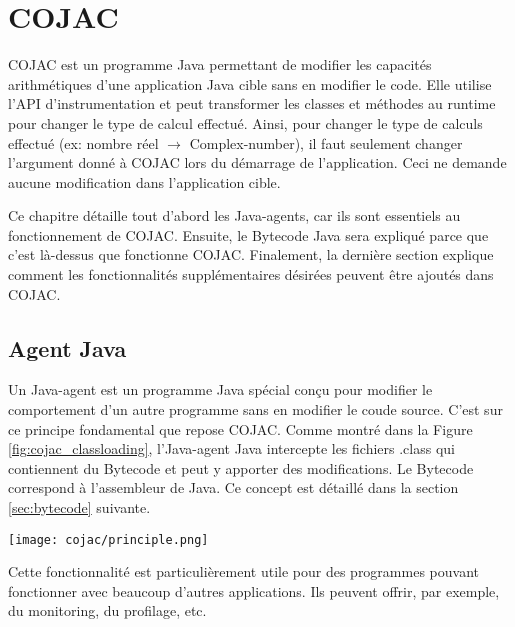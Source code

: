 
\chapter{COJAC}

\gls{COJAC} \cite{COJAC} est un programme Java permettant de modifier les capacités arithmétiques d'une application Java cible sans en modifier le code. Elle utilise l'API d'instrumentation et peut transformer les classes et méthodes au runtime pour changer le type de calcul effectué. Ainsi, pour changer le type de calculs effectué (ex: nombre réel $\rightarrow$ \gls{Complex-number}), il faut seulement changer l'argument donné à \gls{COJAC} lors du démarrage de l'application. Ceci ne demande aucune modification dans l'application cible.

Ce chapitre détaille tout d'abord les \glspl{Java-agent}, car ils sont essentiels au fonctionnement de \gls{COJAC}. Ensuite, le \gls{Bytecode} Java sera expliqué parce que c'est là-dessus que fonctionne \gls{COJAC}. Finalement, la dernière section explique comment les fonctionnalités supplémentaires désirées peuvent être ajoutés dans \gls{COJAC}.

\section{Agent Java}
\label{sec:agent_java}

Un \gls{Java-agent} est un programme Java spécial conçu pour modifier le comportement d'un autre programme sans en modifier le coude source. C'est sur ce principe fondamental que repose \gls{COJAC}. Comme montré dans la Figure \ref{fig:cojac_classloading}, l'\gls{Java-agent} Java intercepte les fichiers .class qui contiennent du \gls{Bytecode} et peut y apporter des modifications. Le \gls{Bytecode} correspond à l'assembleur de Java. Ce concept est détaillé dans la section \ref{sec:bytecode} suivante.

\begin{minipage}{\linewidth}
    \centering
    \texttt{[image: cojac/principle.png]}
    \label{fig:cojac_classloading}
\end{minipage}

Cette fonctionnalité est particulièrement utile pour des programmes pouvant fonctionner avec beaucoup d'autres applications. Ils peuvent offrir, par exemple, du monitoring, du profilage, etc.

